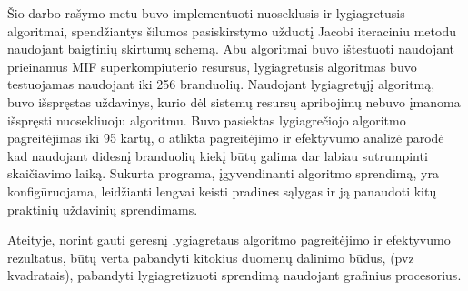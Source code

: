 \documentclass{VUMIFPSbakalaurinis}
\begin{document}




Šio darbo rašymo metu buvo implementuoti nuoseklusis ir lygiagretusis algoritmai, spendžiantys šilumos pasiskirstymo užduotį Jacobi iteraciniu metodu naudojant baigtinių skirtumų schemą.
Abu algoritmai buvo ištestuoti naudojant prieinamus MIF superkompiuterio resursus, lygiagretusis algoritmas buvo testuojamas naudojant iki 256 branduolių.
Naudojant lygiagretųjį algoritmą, buvo išspręstas uždavinys, kurio dėl sistemų resursų apribojimų nebuvo įmanoma išspręsti nuosekliuoju algoritmu. 
Buvo pasiektas lygiagrečiojo algoritmo pagreitėjimas iki 95 kartų, o atlikta pagreitėjimo ir efektyvumo analizė parodė kad naudojant didesnį branduolių kiekį būtų galima dar labiau sutrumpinti skaičiavimo laiką.
Sukurta programa, įgyvendinanti algoritmo sprendimą, yra konfigūruojama, leidžianti lengvai keisti pradines sąlygas ir ją panaudoti kitų praktinių uždavinių sprendimams.

Ateityje, norint gauti geresnį lygiagretaus algoritmo pagreitėjimo ir efektyvumo rezultatus, būtų verta pabandyti kitokius duomenų dalinimo būdus, (pvz kvadratais), pabandyti lygiagretizuoti sprendimą naudojant grafinius procesorius.
\end{document}
